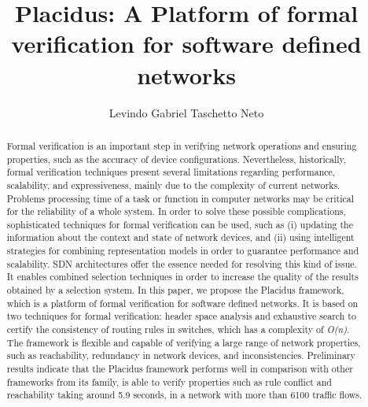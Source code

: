 \documentclass[12pt]{article}
\title{Placidus: A Platform of formal verification for software defined networks}
\author{Levindo Gabriel Taschetto Neto\inst{1}}
\begin{document}
 

\maketitle

\begin{abstract}
Formal verification is an important step in verifying network operations and ensuring properties, such as the accuracy of device configurations. Nevertheless, historically, formal verification techniques present several limitations regarding performance, scalability, and expressiveness, mainly due to the complexity of current networks.
Problems processing time of a task or function in computer networks may be critical for the reliability of a whole system.
In order to solve these possible complications, sophisticated techniques for formal verification can be used, such as (i) updating the information about the context and state of network devices, and (ii) using intelligent strategies for combining representation models in order to guarantee performance and scalability.
SDN architectures offer the essence needed for resolving this kind of issue. It enables combined selection techniques in order to increase the quality of the results obtained by a selection system.
In this paper, we propose the Placidus framework, which is a platform of formal verification for software defined networks. It is based on two techniques for formal verification: header space analysis and exhaustive search to certify the consistency of routing rules in switches, which has a complexity of \textit{O(n)}.
The framework is flexible and capable of verifying a large range of network properties, such as reachability, redundancy in network devices, and inconsistencies.
Preliminary results indicate that the Placidus framework performs well in comparison with other frameworks from its family, is able to verify properties such as rule conflict and reachability taking around 5.9 seconds, in a network with more than 6100 traffic flows.
\end{abstract}
\end{document}
